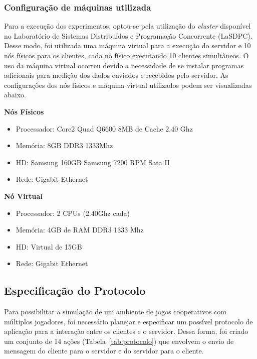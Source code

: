 \documentclass[12pt]{article}
\begin{document}
\subsubsection{Configuração de máquinas utilizada}

Para a execução dos experimentos, optou-se pela utilização do \textit{cluster}
disponível no Laboratório de Sistemas Distribuídos e Programação Concorrente
(LaSDPC). Desse modo, foi utilizada uma máquina virtual para a execução do
servidor e 10 nós físicos para os clientes, cada nó físico executando 10 clientes simultâneos. O uso da máquina virtual ocorreu
devido a necessidade de se instalar programas adicionais para medição dos dados
enviados e recebidos pelo servidor.  As configurações dos nós físicos e máquina
virtual utilizados podem ser visualizadas abaixo.

\textbf{Nós Físicos}

\begin{itemize}
  \item Processador: Core2 Quad Q6600 8MB de Cache 2.40 Ghz
  \item Memória: 8GB DDR3 1333Mhz
  \item HD: Samsung 160GB Samsung 7200 RPM Sata II
  \item Rede: Gigabit Ethernet 
\end{itemize}

\textbf{Nó Virtual}

\begin{itemize}
  \item Processador: 2 CPUs (2.40Ghz cada)
  \item Memória: 4GB de RAM DDR3 1333 Mhz
  \item HD: Virtual de 15GB
  \item Rede: Gigabit Ethernet
\end{itemize}

\subsection{Especificação do Protocolo} \label{sub:protocolo}

Para possibilitar a simulação de um ambiente de jogos cooperativos com
múltiplos jogadores, foi necessário planejar e especificar um possível
protocolo de aplicação para a interação entre os clientes e o servidor.  Dessa
forma, foi criado um conjunto de 14 ações (Tabela~\ref{tab:protocolo}) que
envolvem o envio de mensagem do cliente para o servidor e do servidor para o
cliente.
\end{document}
